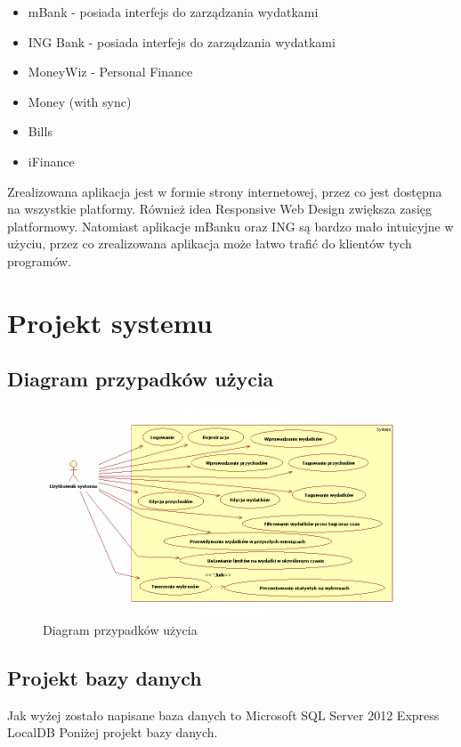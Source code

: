 \documentclass[10pt,titlepage]{article}
\begin{document}
\begin{itemize}
  \item mBank - posiada interfejs do zarządzania wydatkami
  \item ING Bank - posiada interfejs do zarządzania wydatkami
  \item MoneyWiz - Personal Finance
  \item Money (with sync)
  \item Bills
  \item iFinance
\end{itemize}
\par Zrealizowana aplikacja jest w formie strony internetowej, przez co jest dostępna na wszystkie platformy. Również idea Responsive Web Design zwiększa zasięg platformowy. Natomiast aplikacje mBanku oraz ING są bardzo mało intuicyjne w użyciu, przez co zrealizowana aplikacja może łatwo trafić do klientów tych programów.
\section{Projekt systemu}
\subsection{Diagram przypadków użycia}
\begin{figure}[H]
  \centering
  \includegraphics[scale=0.7]{images/use_case.png}
  \caption{Diagram przypadków użycia}
\end{figure}
\subsection{Projekt bazy danych}
Jak wyżej zostało napisane baza danych to Microsoft SQL Server 2012 Express LocalDB
Poniżej projekt bazy danych.
\end{document}
